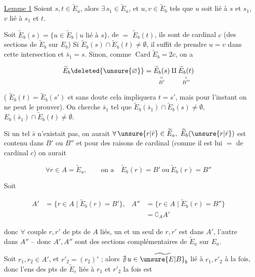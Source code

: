 \uline{Lemme 1}  Soient $s,t\in\widetilde E_a$, alors $\exists\,s_1\in\widetilde E_a$, et $u,v\in\widetilde E_b$ tels que $u$ soit lié à $s$ et $s_1$, $v$ lié à $s_1$ et $t$.


Soit $\widetilde E_{b}(s)=\{u\in\widetilde E_b\mid u\text{ lié à }s\}$, de $=$ $\widetilde E_b(t)$, ils sont de cardinal $c$ (des sections de $\widetilde E_b$ sur $E_b$) Si $\widetilde E_b(s)\cap\widetilde E_b(t)\neq\emptyset$, il suffit de prendre $u=v$  dans cette intersection et $\bar s_1=s$. Sinon, comme $\operatorname{Card}\widetilde E_b=2c$, on a

\[ \widetilde E_b\deleted{\unsure{\varnothing}}=\underset{\substack{\shortparallel\\ B'}}{\widetilde E_b(s)}\amalg\underset{\substack{\shortparallel\\ B''}}{\widetilde E_b(t)} \]

( $\widetilde E_b(t)=\widetilde E_b(s')$ et sans doute cela impliquera $t=s'$, mais pour l'instant on ne peut le prouver). On cherche  $\bar s_1$ tel que $\widetilde E_b(\bar s_1)\cap\widetilde E_b(s)\neq\emptyset$, $E_b(\bar s_1)\cap\widetilde E_b(t)\neq\emptyset$.

Si un tel $\bar s$ n'existait pas, on aurait $\forall\,\unsure{r|\bar r}\in\widetilde E_a,\ \widetilde E_b(\unsure{r|\bar r})$ est contenu dans  $B'$ ou $B''$ et pour des raisons de cardinal (comme il est lui $=$ de cardinal $c$) on aurait

\[ \forall r\in A=\widetilde E_a,\qquad \text{on a}\quad \widetilde E_b(r)=B'\ \text{ou}\ \widetilde E_b(r)=B'' \]

Soit

\[
\begin{aligned}
A'&=\{r\in A\mid\widetilde E_b(r)=B'\},& A''&=\{r\in A\mid\widetilde E_b(r)=B''\}\\
&&&=\complement_AA'
\end{aligned}
\]

donc  $\forall$ couple $r,r'$ de pts de $A$ liés, un et un seul de $r,r'$ est dans $A'$, l'autre dans $A''$ -- donc $A',A''$ sont des sections complémentaires de $\widetilde E_a$ sur $E_a$.

Soit   $r_1,r_2\in A'$,      et $r'_2=(r_2)'$ ;  alors $\nexists\,u\in\widetilde{\unsure{E|B}}_b$ lié à $r_1,r'_2$ à la fois, donc l'ens des pts de $\widetilde E_c$ liés à $r_1$ et $r'_2$  la fois est


